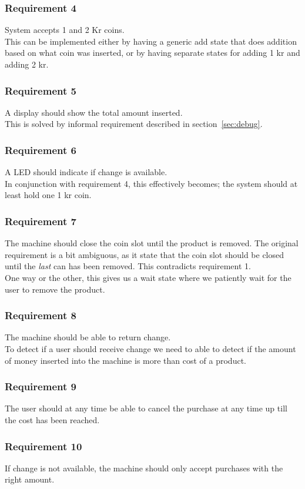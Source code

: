 \subsubsection*{Requirement 4}
System accepts 1 and 2 Kr coins.\\
This can be implemented either by having a generic add state that does addition based on what coin was inserted, or by having separate states for adding 1 kr and adding 2 kr.

\subsubsection*{Requirement 5}
A display should show the total amount inserted.\\
This is solved by informal requirement described in section~\ref{sec:debug}. 

\subsubsection*{Requirement 6}
A LED should indicate if change is available.\\
In conjunction with requirement 4, this effectively becomes; the system should at least hold one 1 kr coin. 

\subsubsection*{Requirement 7}
The machine should close the coin slot until the product is removed. The original requirement is a bit ambiguous, as it state that the coin slot should be closed until the \emph{last} can has been removed. This contradicts requirement 1.\\
One way or the other, this gives us a wait state where we patiently wait for the user to remove the product.

\subsubsection*{Requirement 8}
The machine should be able to return change.\\
To detect if a user should receive change we need to able to detect if the amount of money inserted into the machine is more than cost of a product.

\subsubsection*{Requirement 9}
The user should at any time be able to cancel the purchase at any time up till the cost has been reached.\\


\subsubsection*{Requirement 10}
If change is not available, the machine should only accept purchases with the right amount.